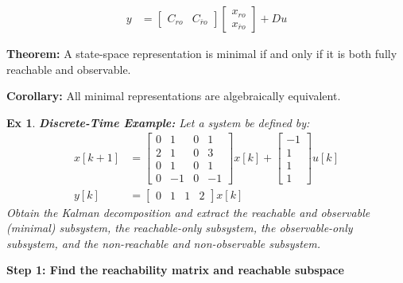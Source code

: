 \documentclass[twoside, 11pt, a4paper]{article}
\newtheorem{exmp}[theorem]{Ex}
\begin{document}
\begin{itemize}
\begin{align*}
        \\
        y &= \left[ \begin{array}{c|c} C_{ro} & C_{\bar{r}o} \end{array} \right] \begin{bmatrix} x_{ro} \\ x_{\bar{r}o}\end{bmatrix} + D u
    \end{align*}
\end{itemize}

\textbf{Theorem:} A state-space representation is minimal if and only if it is both fully reachable and observable. 

\textbf{Corollary:} All minimal representations are algebraically equivalent. 

\begin{exmp}
\textbf{Discrete-Time Example:} Let a system be defined by:
\begin{align*}
    x[k+1] &= \left[ \begin{array}{cccc} 0 & 1 & 0 & 1 \\ 
    2 & 1 & 0 & 3 \\ 
    0 & 1 & 0 & 1 \\ 
    0 & -1 & 0 & -1 
    \end{array} \right] x[k] + 
    \left[ \begin{array}{c} -1 \\ 
    1 \\ 
    1 \\ 
    1
    \end{array} \right] u[k]
    \\
    y[k] &= \left[ \begin{array}{cccc} 0 & 1 & 1 & 2 \end{array} \right] x[k]
\end{align*}
%
Obtain the Kalman decomposition and extract the reachable and observable (minimal) subsystem, the reachable-only subsystem, the observable-only subsystem,
and the non-reachable and non-observable subsystem.
\end{exmp}
%
\textbf{Step 1: Find the reachability matrix and reachable subspace}
%
\end{document}
